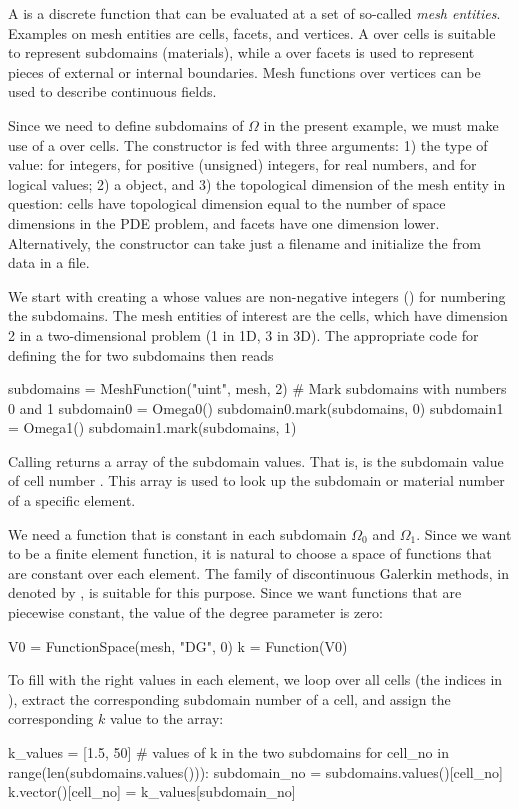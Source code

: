 A  is a discrete function that can be evaluated at a
set of so-called \emph{mesh entities}. Examples on mesh entities are cells,
facets, and vertices. A  over cells is suitable
to represent subdomains (materials), while a  over
facets is used to represent pieces of external or internal boundaries.
Mesh functions over vertices can be used to describe continuous fields.

Since we need to define subdomains of $\Omega$ in the present example, we
must make use of a  over cells. The 
constructor is fed with three arguments: 1) the type of value:
 for integers,  for positive (unsigned) integers,
 for real numbers, and  for logical values; 2)
a  object, and 3) the topological dimension of the mesh entity
in question: cells have topological dimension equal to the number of
space dimensions in the PDE problem, and facets have one dimension lower.
Alternatively, the constructor can take just a filename and initialize
the  from data in a file.

We start with creating a  whose values are non-negative
integers () for numbering the subdomains.  The mesh entities
of interest are the cells, which have dimension 2 in a two-dimensional
problem (1 in 1D, 3 in 3D). The appropriate code for defining the
 for two subdomains then reads
\begin{python}
subdomains = MeshFunction("uint", mesh, 2)
# Mark subdomains with numbers 0 and 1
subdomain0 = Omega0()
subdomain0.mark(subdomains, 0)
subdomain1 = Omega1()
subdomain1.mark(subdomains, 1)
\end{python}

Calling  returns a  array of the
subdomain values. That is,  is the subdomain
value of cell number . This array is used to look up the subdomain
or material number of a specific element.

We need a function  that is constant in each subdomain $\Omega_0$
and $\Omega_1$. Since we want  to be a finite element function,
it is natural to choose a space of functions that are constant over each
element.  The family of discontinuous Galerkin methods, in \fenics{}
denoted by , is suitable for this purpose. Since we want
functions that are piecewise constant, the value of the degree parameter
is zero:
\begin{python}
V0 = FunctionSpace(mesh, "DG", 0)
k  = Function(V0)
\end{python}
To fill  with the right values in each element, we loop over all
cells (the indices in ), extract the corresponding
subdomain number of a cell, and assign the corresponding $k$ value to
the  array:
\begin{python}
k_values = [1.5, 50]  # values of k in the two subdomains
for cell_no in range(len(subdomains.values())):
    subdomain_no = subdomains.values()[cell_no]
    k.vector()[cell_no] = k_values[subdomain_no]
\end{python}

